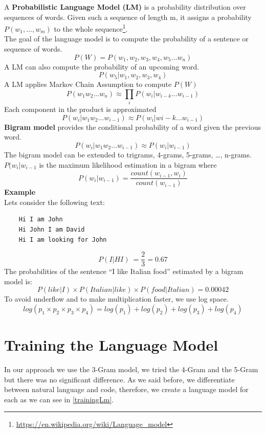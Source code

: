 \documentclass[12pt,mscthesis]{usiinfthesis}
\begin{document}
	A \textbf{Probabilistic Language Model (LM)} is a probability distribution over sequences of words. Given such a sequence of length m, it assigns a probability $P(w_{1},\ldots ,w_{m})$ to the whole sequence\footnote{\url{https://en.wikipedia.org/wiki/Language_model}}.\\
	The goal of the language model is to compute the probability of a sentence or sequence of words.
	\[P(W) = P(w_{1},w_2,w_3,w_4,w_5\dots w_n)\]
	A LM can also compute the probability of an upcoming word.
	\[P(w_5|w_1,w_2,w_3,w_4)\]
	A LM applies Markov Chain Assumption to compute $P(W)$
	\[P(w_1w_2\dots w_n) \approx \prod_{i} P(w_i|w_{i-k} \dots w_{i-1})\]
	Each component in the product is approximated
	\[P(w_i |w_1w_2\dots w_{i-1}) \approx P(w_i |w{i-k} \dots w_{i-1})\]
	\textbf{Bigram model} provides the conditional probability of a word given the previous word.
	\[P(w_i |w_1w_2 \dots w_{i-1})\approx P(w_i |w_{i-1})\]
	The bigram model can be extended to trigrams, 4-grams, 5-grams, \dots , n-grams.\\
	$P(w_i |w_{i-1}$ is the maximum likelihood estimation in a bigram where 
	\[P(w_{i}|w_{{i-1}})=\frac{count(w_{{i-1}},w_{i})} {count(w_{{i-1}})}\]
	\textbf{Example}\\
	Lets consider the following text:
	\begin{verbatim}
	Hi I am John
	Hi John I am David
	Hi I am looking for John
\end{verbatim}
	\[P(I|HI)\ = \frac{2}{3} = 0.67\]
	The probabilities of the sentence ``I like Italian food'' estimated by a bigram model is:
	\[P(like|I) \times P(Italian|like) \times P(food|Italian)= 0.00042\]
	To avoid underflow and to make multiplication faster, we use log space.
	\[log( p_1 \times p_2 \times p_3 \times p_4 ) = log (p_1) + log (p_2) + log (p_3) + log (p_4)\]



	\section*{Training the Language Model}
	In our approach we use the 3-Gram model, we tried the 4-Gram and the 5-Gram but there was no significant difference. As we said before, we differentiate between natural language and code, therefore, we create a language model for each as we can see in \cref{trainingLm}.\\
\end{document}
